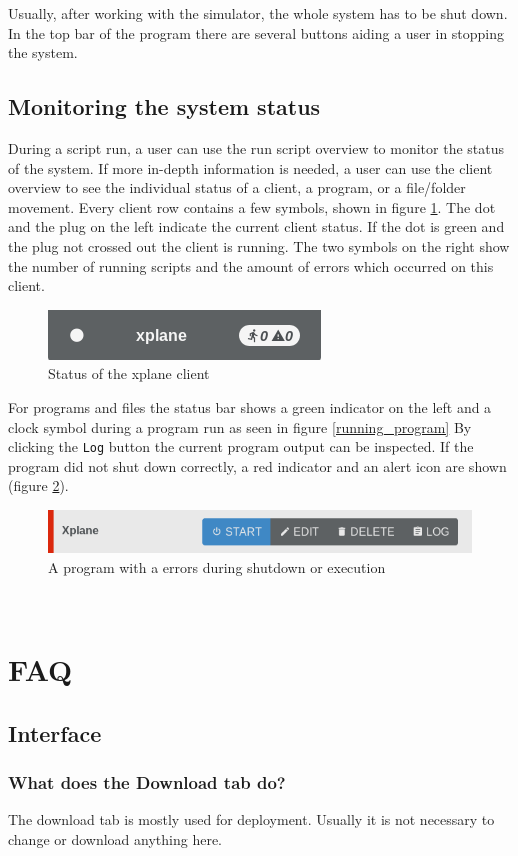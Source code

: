 \documentclass[accentcolor=tud1a, paper=a4, colorback]{tudreport}
\begin{document}
	Usually, after working with the simulator, the whole system has to be shut down. In the top
	bar of the program there are several buttons aiding a user in stopping the system.

	\section{Monitoring the system status}
	During a script run, a user can use the run script overview to monitor the status of the
	system. If more in-depth information is needed, a user can use the client overview to
	see the individual status of a client, a program, or a file/folder movement.
	Every client row contains a few symbols, shown in figure \ref{client_status}.
	The dot and the plug on the left indicate the current client status. If the dot is
	green and the plug not crossed out the client is running. The two symbols on the right
	show the number of running scripts and the amount of errors which occurred on this client.
	\begin{figure}[h]
		\centering
		\includegraphics[width=.3\textwidth]{client_status}
		\caption{Status of the xplane client}
		\label{client_status}
	\end{figure}
	For programs and files the status bar shows a green indicator on the left and a clock symbol
	during a program run as seen in figure \ref{running_program}
	By clicking the \texttt{Log} button the current program output can be inspected.
	If the program did not shut down correctly, a red indicator and an alert icon are shown (figure \ref{failed_program}).
	\begin{figure}[h]
		\centering
		\includegraphics[width=.6\textwidth]{failed_program}
		\caption{A program with a errors during shutdown or execution}
		\label{failed_program}
	\end{figure}\\


	\chapter{FAQ}
	\section{Interface}
	\subsection{What does the Download tab do?}
	The download tab is mostly used for deployment. Usually it is not necessary to change or
	download anything here.

	\clearpage
	\printindex
\end{document}
